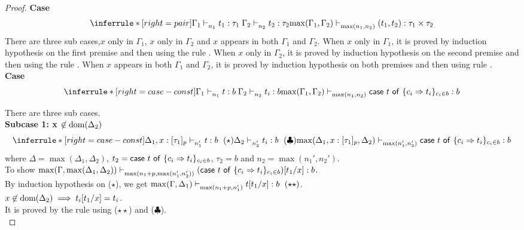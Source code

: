 \documentclass{article}
\begin{document}
\begin{proof}
\noindent \textbf{Case} 
$$
     \inferrule*[right = pair]
   {\Gamma_1 \jtype{n_1}{}{t_1}{\tau_1} \\ \Gamma_2 \jtype{n_2}{}{t_2}{\tau_2}}
   { \max(\Gamma_1, \Gamma_2)  \jtype{\max(n_1,n_2)}{}{(t_1, t_2)}{\tau_1 \times \tau_2}  }
$$
There are three sub cases,$x$ only in $\Gamma_1$,  $x$ only in $\Gamma_2$ and $x$ appears in both $\Gamma_1$ and $\Gamma_2$. When $x$ only in $\Gamma_1$, it is proved by induction hypothesis on the first premise and then using the rule . When $x$ only in $\Gamma_2$, it is proved by induction hypothesis on the second premise and then using the rule . When $x$  appears in both $\Gamma_1$ and $\Gamma_2$, it is proved by induction hypothesis on both premises and then using rule .\\

\noindent \textbf{Case} 
$$
    \inferrule*[ right = case-const ]
   {\Gamma_1 \jtype{n_1}{}{t}{b} \\ \Gamma_2 \jtype{n_2}{}{t_i}{b} }
   {\max(\Gamma_1, \Gamma_2) \jtype{\max(n_1,n_2)}{}{\tcaseof{t}\ \{c_i \Rightarrow t_i\}_{c_i \in b} } {b} }
$$

There are three sub cases.\\

\textbf{Subcase 1: x $\not \in \text{dom}(\Delta_2)$ }
\[
   \inferrule*[ right = case-const ]
   {\Delta_1, x: [\tau_1]_p \jtype{n_1'}{}{t}{b}~(\star) \\ \Delta_2 \jtype{n_2'}{}{t_i}{b}~(\clubsuit) }
   {\max(\Delta_1, x: [\tau_1]_p, \Delta_2) \jtype{\max(n_1',n_2')}{}{\tcaseof{t}\ \{c_i \Rightarrow t_i\}_{c_i \in b} } {b} }
\]
where $\Delta = \max(\Delta_1, \Delta_2)$, $t_2 =\mathsf{case}~t~\mathsf{of}\ \{c_i \Rightarrow t_i\}_{c_i \in b}$, $\tau_2 = b$ and $n_2 = \max(n_1', n_2')$.\\ 
To show $ \max(\Gamma, \max(\Delta_1,\Delta_2) ) \mathrel{\vdash_{\max(n_1 + p,\max(n_1',n_2') )}^{} {  (\mathsf{case}~t~\mathsf{of}\ \{c_i \Rightarrow t_i\}_{c_i \in b})[t_1/x] } : {b}}  $. \\
 By induction hypothesis on ($\star$), we get $\max(\Gamma, \Delta_1) \jtype{\max(n_1 + p, n_1') }{}{t[t_1/x]}{b}~(\star\star) $. \\
 $x \not \in \text{dom}(\Delta_2) \implies t_i[t_1/x] =  t_i$.\\
 It is proved by the rule  using ($\star\star$) and ($\clubsuit$). \\


\end{proof}
\end{document}
